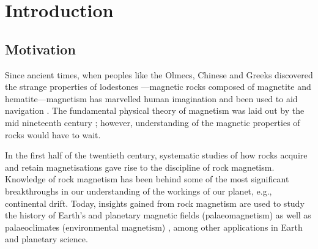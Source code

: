 \chapter{Introduction}
\label{ch:intro}
\fancyhead[C]{}
\fancyhead[R]{}
\fancyfoot[C]{\thepage}

\section{Motivation}
Since ancient times, when peoples like the Olmecs, Chinese and Greeks discovered the strange properties of lodestones \citep{Carlson1975,Evans1977}---magnetic rocks composed of magnetite and hematite---magnetism has marvelled human imagination and been used to aid navigation \citep{May1981}. The fundamental physical theory of magnetism was laid out by the mid nineteenth century \citep{Maxwell1861}; however, understanding of the magnetic properties of rocks would have to wait.\par

In the first half of the twentieth century, systematic studies of how rocks acquire and retain magnetisations \citep{Koenigsberger1938,Thellier1938,Nagata1943} gave rise to the discipline of rock magnetism. Knowledge of rock magnetism has been behind some of the most significant breakthroughs in our understanding of the workings of our planet, e.g., continental drift. Today, insights gained from rock magnetism are used to study the history of Earth's and planetary magnetic fields (palaeomagnetism) \citep{Dunlop} as well as palaeoclimates (environmental magnetism) \citep{Evans}, among other applications in Earth and planetary science.\par


